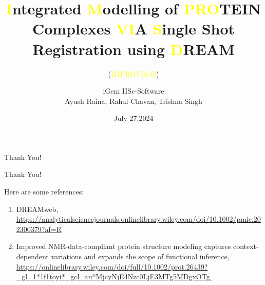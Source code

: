 \documentclass{beamer}
\author{iGem IISc-Software \\ Ayush Raina, Rahul Chavan, Trishna Singh}
\title{\textcolor{yellow}{I}ntegrated \textcolor{yellow}{M}odelling of \textcolor{yellow}{PRO}TEIN Complexes \textcolor{yellow}{VI}A \textcolor{yellow}{S}ingle Shot Registration using \textcolor{yellow}{D}REAM}
\subtitle{(\textcolor{yellow}{IMPROVISeD})}
\date{July 27,2024}
\begin{document}
\begin{frame}
    \titlepage
\end{frame}







\begin{frame}{Thank You!}
    \begin{center}
        \Huge Thank You!
    \end{center}
    Here are some references:
    \begin{enumerate}
        \item DREAMweb, \url{https://analyticalsciencejournals.onlinelibrary.wiley.com/doi/10.1002/pmic.202300379?af=R}
        \item Improved NMR-data-compliant protein structure modeling captures context-dependent variations and expands the scope of functional inference, \url{https://onlinelibrary.wiley.com/doi/full/10.1002/prot.26439?_gl=1*1f1toyi*_gcl_au*MjcyNjE4Nzc0LjE3MTg5MDgxOTg.}
    \end{enumerate}
\end{frame}
\end{document}
